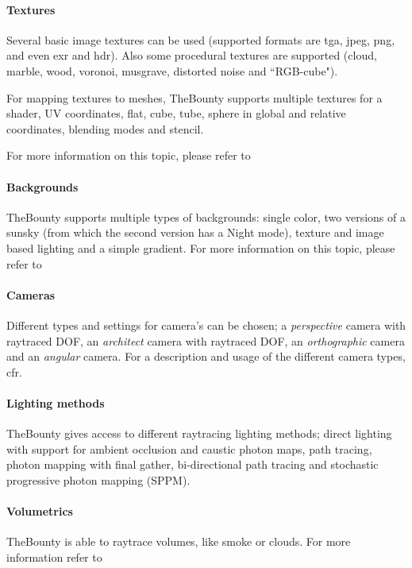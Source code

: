 \paragraph{Textures} Several basic image textures can be used (supported formats are tga, jpeg, png, and even exr and hdr). Also some procedural textures are supported (cloud, marble, wood, voronoi, musgrave, distorted     noise and ``RGB-cube").

For mapping textures to meshes, TheBounty supports multiple textures for a shader, UV coordinates, flat, cube, tube, sphere in global and relative coordinates, blending modes and stencil.  

For more information on this topic, please refer to 

\paragraph{Backgrounds} TheBounty supports multiple types of backgrounds: single color, two versions of a sunsky (from which the second version has a Night mode), texture and image based lighting and a simple gradient. For more information on this topic, please refer to 

\paragraph{Cameras} Different types and settings for camera's can be chosen; a \textit{perspective} camera with raytraced DOF, an \textit{architect} camera with raytraced DOF, an \textit{orthographic} camera and an \textit{angular} camera. For a description and usage of the different camera types, cfr. 

\paragraph{Lighting methods} TheBounty gives access to different raytracing lighting methods; direct lighting with support for ambient occlusion and caustic photon maps, path tracing, photon mapping with final gather, bi-directional path tracing and stochastic progressive photon mapping (SPPM).

\paragraph{Volumetrics} TheBounty is able to raytrace volumes, like smoke or clouds. For more information refer to 

